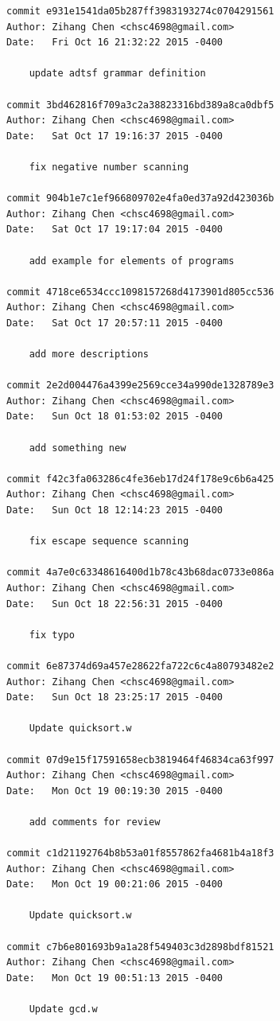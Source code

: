 \documentclass{report}
\begin{document}
\begin{appendices}
\begin{verbatim}
commit e931e1541da05b287ff3983193274c0704291561
Author: Zihang Chen <chsc4698@gmail.com>
Date:   Fri Oct 16 21:32:22 2015 -0400

    update adtsf grammar definition

commit 3bd462816f709a3c2a38823316bd389a8ca0dbf5
Author: Zihang Chen <chsc4698@gmail.com>
Date:   Sat Oct 17 19:16:37 2015 -0400

    fix negative number scanning

commit 904b1e7c1ef966809702e4fa0ed37a92d423036b
Author: Zihang Chen <chsc4698@gmail.com>
Date:   Sat Oct 17 19:17:04 2015 -0400

    add example for elements of programs

commit 4718ce6534ccc1098157268d4173901d805cc536
Author: Zihang Chen <chsc4698@gmail.com>
Date:   Sat Oct 17 20:57:11 2015 -0400

    add more descriptions

commit 2e2d004476a4399e2569cce34a990de1328789e3
Author: Zihang Chen <chsc4698@gmail.com>
Date:   Sun Oct 18 01:53:02 2015 -0400

    add something new

commit f42c3fa063286c4fe36eb17d24f178e9c6b6a425
Author: Zihang Chen <chsc4698@gmail.com>
Date:   Sun Oct 18 12:14:23 2015 -0400

    fix escape sequence scanning

commit 4a7e0c63348616400d1b78c43b68dac0733e086a
Author: Zihang Chen <chsc4698@gmail.com>
Date:   Sun Oct 18 22:56:31 2015 -0400

    fix typo

commit 6e87374d69a457e28622fa722c6c4a80793482e2
Author: Zihang Chen <chsc4698@gmail.com>
Date:   Sun Oct 18 23:25:17 2015 -0400

    Update quicksort.w

commit 07d9e15f17591658ecb3819464f46834ca63f997
Author: Zihang Chen <chsc4698@gmail.com>
Date:   Mon Oct 19 00:19:30 2015 -0400

    add comments for review

commit c1d21192764b8b53a01f8557862fa4681b4a18f3
Author: Zihang Chen <chsc4698@gmail.com>
Date:   Mon Oct 19 00:21:06 2015 -0400

    Update quicksort.w

commit c7b6e801693b9a1a28f549403c3d2898bdf81521
Author: Zihang Chen <chsc4698@gmail.com>
Date:   Mon Oct 19 00:51:13 2015 -0400

    Update gcd.w


\end{verbatim}
\end{appendices}
\end{document}
